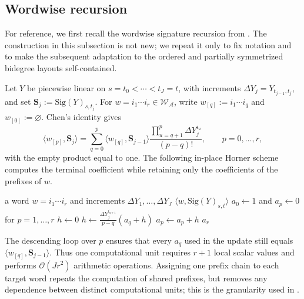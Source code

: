 \documentclass{amsart}
\theoremstyle{definition}
\theoremstyle{remark}
\newcommand{\Sig}[1]{\mathrm{Sig}(#1)}
\begin{document}
\subsection{Wordwise recursion}

For reference, we first recall the wordwise signature recursion from
\cite[Secs.~3.1--3.2]{nygaard2026pathsig}. The construction in this
subsection is not new; we repeat it only to fix notation and to make the
subsequent adaptation to the ordered and partially symmetrized bidegree
layouts self-contained.

Let $Y$ be piecewise linear on $s=t_0<\cdots<t_J=t$, with increments
$\Delta Y_j=Y_{t_{j-1},t_j}$, and set
$\mathbf{S}_j:=\Sig{Y}_{s,t_j}$. For
$w=i_1\cdots i_r\in\mathcal{W}_{\mathcal{A}}$, write
$w_{[q]}:=i_1\cdots i_q$ and $w_{[0]}:=\varnothing$. Chen's identity gives
\[
    \big\langle w_{[p]},\mathbf{S}_j\big\rangle
    =
    \sum_{q=0}^{p}
    \big\langle w_{[q]},\mathbf{S}_{j-1}\big\rangle
    \frac{
        \prod_{u=q+1}^{p}\Delta Y_j^{i_u}
    }{
        (p-q)!
    },
    \qquad
    p=0,\ldots,r,
\]
with the empty product equal to one. The following in-place Horner scheme
computes the terminal coefficient while retaining only the coefficients of
the prefixes of $w$.

\begin{algorithm}[ht]
\caption{Signature computation over one prefix chain}
\label{alg:word_parallel_signature}
\begin{algorithmic}[1]
\Require a word $w=i_1\cdots i_r$ and increments
$\Delta Y_1,\ldots,\Delta Y_J$
\Ensure $\langle w,\Sig{Y}_{s,t}\rangle$
\State $a_0\gets1$ and $a_p\gets0$ for $p=1,\ldots,r$
        \State $h\gets0$
            \State
            $\displaystyle
            h\gets
            \frac{\Delta Y_j^{i_{q+1}}}{p-q}
            \left(a_q+h\right)$
        \EndFor
        \State $a_p\gets a_p+h$
    \EndFor
\EndFor
\State \Return $a_r$
\end{algorithmic}
\end{algorithm}

The descending loop over $p$ ensures that every $a_q$ used in the update
still equals
$\langle w_{[q]},\mathbf{S}_{j-1}\rangle$. Thus one computational unit
requires $r+1$ local scalar values and performs
$\mathcal{O}(Jr^2)$ arithmetic operations. Assigning one prefix chain to
each target word repeats the computation of shared prefixes, but removes
any dependence between distinct computational units; this is the
granularity used in \cite{nygaard2026pathsig}.
\end{document}
